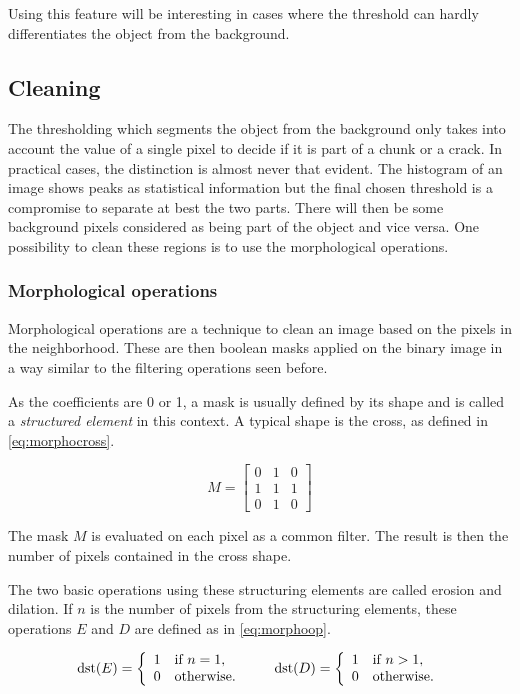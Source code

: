 Using this feature will be interesting in cases where the threshold can hardly differentiates the object from the background.

\subsection{Cleaning}

The thresholding which segments the object from the background only takes into account the value of a single pixel to decide if it is part of a chunk or a crack. In practical cases, the distinction is almost never that evident. The histogram of an image shows peaks as statistical information but the final chosen threshold is a compromise to separate at best the two parts. There will then be some background pixels considered as being part of the object and vice versa. One possibility to clean these regions is to use the morphological operations.

\subsubsection{Morphological operations}
\label{sec:morphop}

Morphological operations are a technique to clean an image based on the pixels in the neighborhood. These are then boolean masks applied on the binary image in a way similar to the filtering operations seen before.

As the coefficients are 0 or 1, a mask is usually defined by its shape and is called a \emph{structured element} in this context. A typical shape is the cross, as defined in \eqref{eq:morphocross}.

\begin{equation}
\label{eq:morphocross}
M =
\begin{bmatrix}
0 & 1 & 0 \\
1 & 1 & 1 \\
0 & 1 & 0
\end{bmatrix}
\end{equation}

The mask $M$ is evaluated on each pixel as a common filter. The result is then the number of pixels contained in the cross shape.

The two basic operations using these structuring elements are called erosion and dilation. If $n$ is the number of pixels from the structuring elements, these operations $E$ and $D$ are defined as in \eqref{eq:morphoop}.

\begin{equation}
\label{eq:morphoop}
\operatorname{dst}(E) =
\left\{
\begin{array}{l l}
    1 & \text{if } n = 1,\\
    0 & \text{otherwise}.
\end{array}
\right. \qquad
\operatorname{dst}(D) =
\left\{
\begin{array}{l l}
    1 & \text{if } n > 1,\\
    0 & \text{otherwise}.
\end{array}
\right.
\end{equation}

